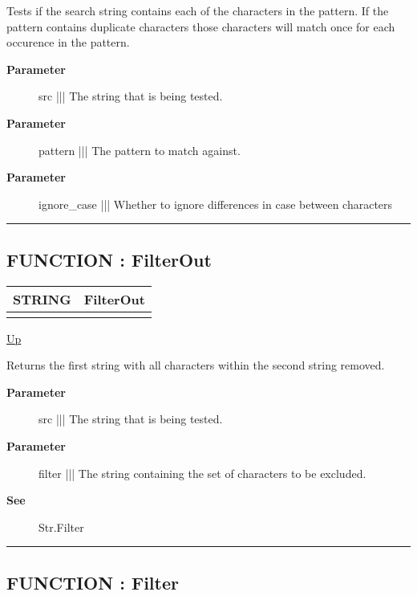 \par
Tests if the search string contains each of the characters in the pattern. If the pattern contains duplicate characters those characters will match once for each occurence in the pattern.

\par
\begin{description}
\item [\textbf{Parameter}] src ||| The string that is being tested.
\item [\textbf{Parameter}] pattern ||| The pattern to match against.
\item [\textbf{Parameter}] ignore\_case ||| Whether to ignore differences in case between characters
\end{description}

\rule{\textwidth}{0.4pt}
\subsection*{FUNCTION : FilterOut}
\hypertarget{ecldoc:str.filterout}{}

{\renewcommand{\arraystretch}{1.5}
\begin{tabularx}{\textwidth}{|>{\raggedright\arraybackslash}l|X|}
\hline
\hspace{0pt}STRING & FilterOut \\
\hline
\multicolumn{2}{|>{\raggedright\arraybackslash}X|}{\hspace{0pt}(STRING src, STRING filter)} \\
\hline
\end{tabularx}
}

\hyperlink{ecldoc:Str}{Up}

\par
Returns the first string with all characters within the second string removed.

\par
\begin{description}
\item [\textbf{Parameter}] src ||| The string that is being tested.
\item [\textbf{Parameter}] filter ||| The string containing the set of characters to be excluded.
\item [\textbf{See}] Str.Filter
\end{description}

\rule{\textwidth}{0.4pt}
\subsection*{FUNCTION : Filter}
\hypertarget{ecldoc:str.filter}{}

